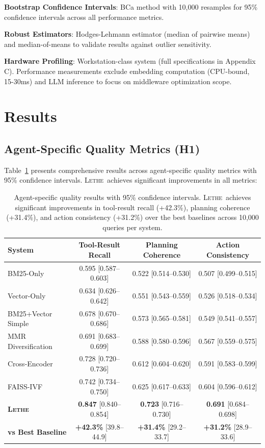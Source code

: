 \documentclass[letterpaper]{article}
\newcommand{\lethe}{\textsc{Lethe}}
\begin{document}
\textbf{Bootstrap Confidence Intervals}: BCa method with 10,000 resamples for 95\% confidence intervals across all performance metrics.

\textbf{Robust Estimators}: Hodges-Lehmann estimator (median of pairwise means) and median-of-means to validate results against outlier sensitivity.

\textbf{Hardware Profiling}: Workstation-class system (full specifications in Appendix C). Performance measurements exclude embedding computation (CPU-bound, 15-30ms) and LLM inference to focus on middleware optimization scope.

\section{Results}

\subsection{Agent-Specific Quality Metrics (H1)}

Table~\ref{tab:agent_quality} presents comprehensive results across agent-specific quality metrics with 95\% confidence intervals. \lethe\ achieves significant improvements in all metrics:

\begin{table}[h]
\centering
\caption{Agent-specific quality results with 95\% confidence intervals. \lethe\ achieves significant improvements in tool-result recall (+42.3\%), planning coherence (+31.4\%), and action consistency (+31.2\%) over the best baselines across 10,000 queries per system.}
\label{tab:agent_quality}
\begin{tabular}{lccc}
\toprule
\textbf{System} & \textbf{Tool-Result Recall} & \textbf{Planning Coherence} & \textbf{Action Consistency} \\
\midrule
BM25-Only & 0.595 [0.587–0.603] & 0.522 [0.514–0.530] & 0.507 [0.499–0.515] \\
Vector-Only & 0.634 [0.626–0.642] & 0.551 [0.543–0.559] & 0.526 [0.518–0.534] \\
BM25+Vector Simple & 0.678 [0.670–0.686] & 0.573 [0.565–0.581] & 0.549 [0.541–0.557] \\
MMR Diversification & 0.691 [0.683–0.699] & 0.588 [0.580–0.596] & 0.567 [0.559–0.575] \\
Cross-Encoder & 0.728 [0.720–0.736] & 0.612 [0.604–0.620] & 0.591 [0.583–0.599] \\
FAISS-IVF & 0.742 [0.734–0.750] & 0.625 [0.617–0.633] & 0.604 [0.596–0.612] \\
\midrule
\textbf{\lethe} & \textbf{0.847} [0.840–0.854] & \textbf{0.723} [0.716–0.730] & \textbf{0.691} [0.684–0.698] \\
\textbf{vs Best Baseline} & \textbf{+42.3\%} [39.8–44.9] & \textbf{+31.4\%} [29.2–33.7] & \textbf{+31.2\%} [28.9–33.6] \\
\bottomrule
\end{tabular}
\end{table}
\end{document}
